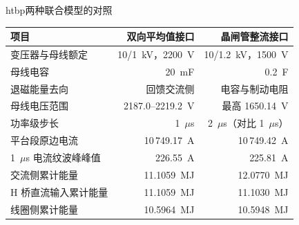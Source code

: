 \begin{dtable}{htbp}{两种联合模型的对照}
\label{tab:compare}
\begin{tabularx}{\linewidth}{LRR}
\toprule
\headrow 项目 & 双向平均值接口 & 晶闸管整流接口 \\
\midrule
变压器与母线额定 & 10/1~kV，2200~V & 10/1.2~kV，1500~V \\
母线电容 & 20~mF & 0.2~F \\
退磁能量去向 & 回馈交流侧 & 电容与制动电阻 \\
母线电压范围 & 2187.0--2219.2~V & 最高 1650.14~V \\
功率级步长 & 1~$\mu$s & 2~$\mu$s（对比 1~$\mu$s） \\
平台段原边电流 & 10\,749.17~A & 10\,749.42~A \\
1~$\mu$s 电流纹波峰峰值 & 226.55~A & 225.81~A \\
交流侧累计能量 & 11.1059~MJ & 12.0770~MJ \\
H 桥直流输入累计能量 & 11.1059~MJ & 11.1030~MJ \\
线圈侧累计能量 & 10.5964~MJ & 10.5948~MJ \\
\bottomrule
\end{tabularx}
\end{dtable}
